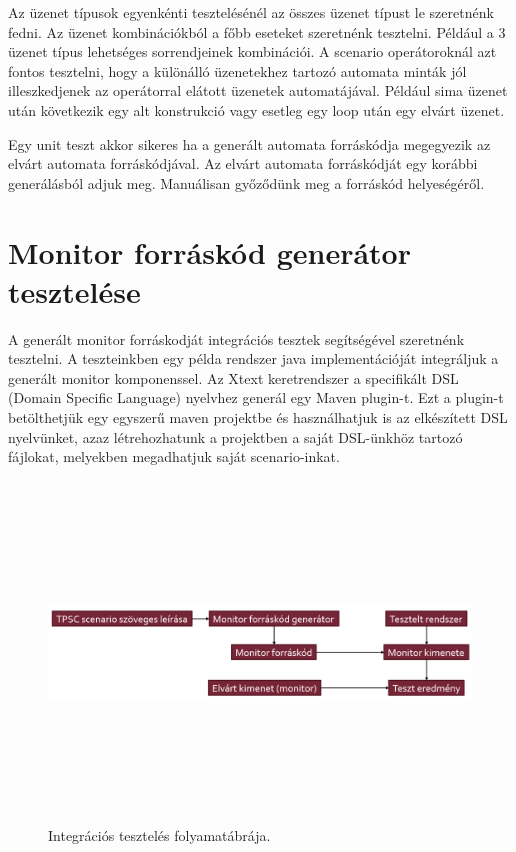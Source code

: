 Az üzenet típusok egyenkénti tesztelésénél az összes üzenet típust le szeretnénk fedni.
Az üzenet kombinációkból a főbb eseteket szeretnénk tesztelni.
Például a 3 üzenet típus lehetséges sorrendjeinek kombinációi.
A scenario operátoroknál azt fontos tesztelni, hogy a különálló üzenetekhez tartozó automata minták jól illeszkedjenek az operátorral elátott üzenetek automatájával.
Például sima üzenet után következik egy alt konstrukció vagy esetleg egy loop után egy elvárt üzenet.

Egy unit teszt akkor sikeres ha a generált automata forráskódja megegyezik az elvárt automata forráskódjával.
Az elvárt automata forráskódját egy korábbi generálásból adjuk meg.
Manuálisan győződünk meg a forráskód helyeségéről.

\clearpage\section{Monitor forráskód generátor tesztelése}

A generált monitor forráskodját integrációs tesztek segítségével szeretnénk tesztelni.
A teszteinkben egy példa rendszer java implementációját integráljuk a generált monitor komponenssel.
Az Xtext keretrendszer a specifikált DSL (Domain Specific Language) nyelvhez generál egy Maven plugin-t.
Ezt a plugin-t betölthetjük egy egyszerű maven projektbe és használhatjuk is az elkészített DSL nyelvünket, azaz létrehozhatunk a projektben a saját DSL-ünkhöz tartozó fájlokat, melyekben megadhatjuk saját scenario-inkat.

\begin{figure}[!ht]
    \centering
    \includegraphics[width=150mm, height=9cm, keepaspectratio]{figures/integration_test_flow.png}
    \caption{Integrációs tesztelés folyamatábrája.}
\end{figure}

